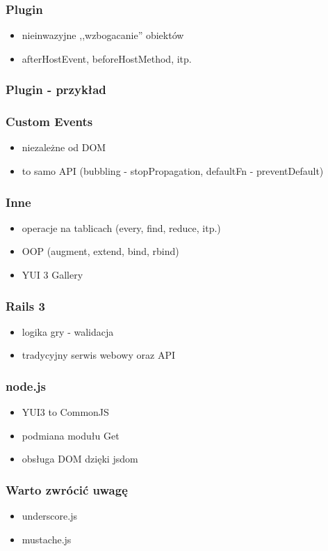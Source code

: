 \documentclass[16pt]{beamer}
\begin{document}
\begin{frame}
  \frametitle{Plugin}
  \begin{itemize}
  \item nieinwazyjne ,,wzbogacanie'' obiektów
  \item afterHostEvent, beforeHostMethod, itp.
  \end{itemize}
\end{frame}

\begin{frame}[fragile]
  \frametitle{Plugin - przykład}
  
\end{frame}

\begin{frame}
  \frametitle{Custom Events}
  \begin{itemize}
  \item niezależne od DOM
  \item to samo API (bubbling - stopPropagation, defaultFn - preventDefault)
  \end{itemize}
\end{frame}

\begin{frame}
  \frametitle{Inne}
  \begin{itemize}
  \item operacje na tablicach (every, find, reduce, itp.)
  \item OOP (augment, extend, bind, rbind)
  \item YUI 3 Gallery
  \end{itemize}
\end{frame}

\begin{frame}
  \frametitle{Rails 3}
  \begin{itemize}
  \item logika gry - walidacja
  \item tradycyjny serwis webowy oraz API %
  \end{itemize}
\end{frame}

\begin{frame}
  \frametitle{node.js}
  \begin{itemize}
  \item YUI3 to CommonJS
  \item podmiana modułu Get
  \item obsługa DOM dzięki jsdom
  \end{itemize}
\end{frame}

\begin{frame}
  \frametitle{Warto zwrócić uwagę}
  \begin{itemize}
  \item underscore.js
  \item mustache.js
  \end{itemize}
\end{frame}

\end{document}
